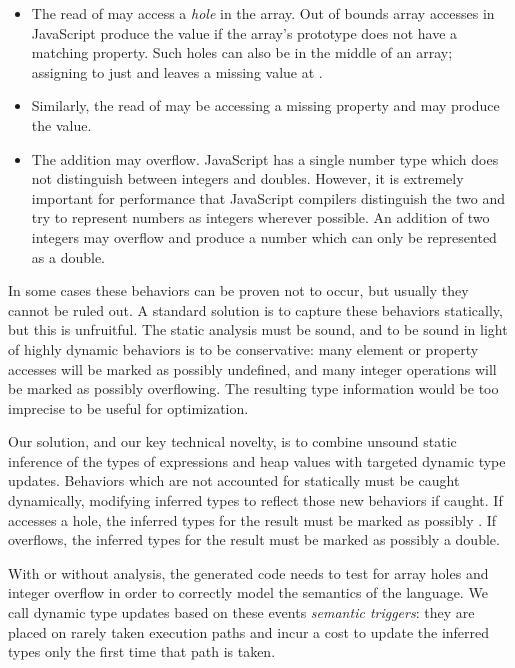 \begin{itemize}

\item The read of  may access a {\it hole} in the array.
Out of bounds array accesses in JavaScript produce the
 value if the array's prototype
does not have a matching property.
Such holes can also be in the middle of an array;
assigning to just  and  leaves a missing
value at .

\item Similarly, the read of  may be accessing a missing property
and may produce the  value.

\item The addition  may overflow.
JavaScript has a single number type which does not distinguish between
integers and doubles.
However, it is extremely important for performance that JavaScript compilers
distinguish the two and try to represent numbers as
integers wherever possible.
An addition of two integers may overflow and produce a number which can
only be represented as a double.

\end{itemize}

In some cases these behaviors can be proven not to occur,
but usually they cannot be ruled out.
A standard solution is to capture these behaviors statically, but this is
unfruitful. The static analysis must be sound, and to be sound in
light of highly dynamic behaviors is to be conservative: many element or property
accesses will be marked as possibly undefined, and many integer operations
will be marked as possibly overflowing.
The resulting type information would be too imprecise to be useful for
optimization.

Our solution, and our key technical novelty, is to combine
unsound static inference
of the types of expressions and heap values
with targeted dynamic type updates.
Behaviors which are not accounted for statically must be caught dynamically,
modifying inferred types to reflect
those new behaviors if caught.
If  accesses a hole, the inferred types for the result must be
marked as possibly .
If  overflows, the inferred types for the result must be
marked as possibly a double.

With or without analysis, the generated code needs to test for array holes
and integer overflow in order to correctly model the semantics of the language.
We call dynamic type updates based on these events {\it semantic triggers}:
they are placed on rarely taken execution paths
and incur a cost to update the inferred types only the first time that
path is taken.

